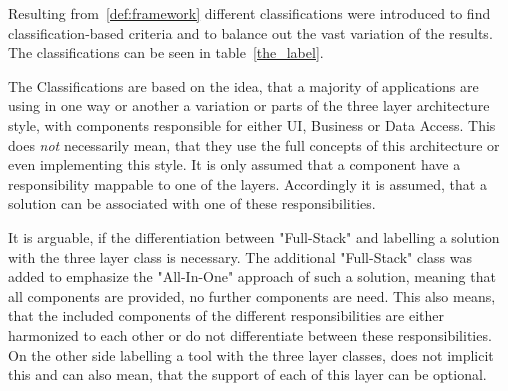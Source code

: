 Resulting from~\ref{def:framework} different classifications were introduced to find classification-based criteria and to balance out the vast variation of the results. The classifications can be seen in table~\ref{the_label}.

The Classifications are based on the idea, that a majority of applications are using in one way or another a variation or parts of the three layer architecture style, with components responsible for either UI, Business or Data Access. This does \textit{not} necessarily mean, that they use the full concepts of this architecture or even implementing this style. It is only assumed that a component have a responsibility mappable to one of the layers. Accordingly it is assumed, that a solution can be associated with one of these responsibilities.

It is arguable, if the differentiation between "Full-Stack" and labelling a solution with the three layer class is necessary. The additional "Full-Stack" class was added to emphasize the "All-In-One" approach of such a solution, meaning that all components are provided, no further components are need. This also means, that the included components of the different responsibilities are either harmonized to each other or do not differentiate between these responsibilities. On the other side labelling a tool with the three layer classes, does not implicit this and can also mean, that the support of each of this layer can be optional.